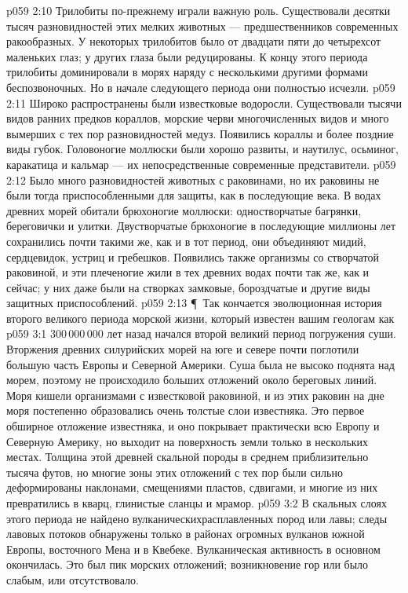 \vs p059 2:10 Трилобиты по\hyp{}прежнему играли важную роль. Существовали десятки тысяч разновидностей этих мелких животных --- предшественников современных ракообразных. У некоторых трилобитов было от двадцати пяти до четырехсот маленьких глаз; у других глаза были редуцированы. К концу этого периода трилобиты доминировали в морях наряду с несколькими другими формами беспозвоночных. Но в начале следующего периода они полностью исчезли.
\vs p059 2:11 Широко распространены были известковые водоросли. Существовали тысячи видов ранних предков кораллов, морские черви многочисленных видов и много вымерших с тех пор разновидностей медуз. Появились кораллы и более поздние виды губок. Головоногие моллюски были хорошо развиты, и наутилус, осьминог, каракатица и кальмар --- их непосредственные современные представители.
\vs p059 2:12 Было много разновидностей животных с раковинами, но их раковины не были тогда приспособленными для защиты, как в последующие века. В водах древних морей обитали брюхоногие моллюски: одностворчатые багрянки, береговички и улитки. Двустворчатые брюхоногие в последующие миллионы лет сохранились почти такими же, как и в тот период, они объединяют мидий, сердцевидок, устриц и гребешков. Появились также организмы со створчатой раковиной, и эти плеченогие жили в тех древних водах почти так же, как и сейчас; у них даже были на створках замковые, бороздчатые и другие виды защитных приспособлений.
\vs p059 2:13 \P\ Так кончается эволюционная история второго великого периода морской жизни, который известен вашим геологам как 
\vs p059 3:1 300\,000\,000 лет назад начался второй великий период погружения суши. Вторжения древних силурийских морей на юге и севере почти поглотили большую часть Европы и Северной Америки. Суша была не высоко поднята над морем, поэтому не происходило больших отложений около береговых линий. Моря кишели организмами с известковой раковиной, и из этих раковин на дне моря постепенно образовались очень толстые слои известняка. Это первое обширное отложение известняка, и оно покрывает практически всю Европу и Северную Америку, но выходит на поверхность земли только в нескольких местах. Толщина этой древней скальной породы в среднем приблизительно тысяча футов, но многие зоны этих отложений с тех пор были сильно деформированы наклонами, смещениями пластов, сдвигами, и многие из них превратились в кварц, глинистые сланцы и мрамор.
\vs p059 3:2 В скальных слоях этого периода не найдено вулканическихрасплавленных пород или лавы; следы лавовых потоков обнаружены только в районах огромных вулканов южной Европы, восточного Мена и в Квебеке. Вулканическая активность в основном окончилась. Это был пик морских отложений; возникновение гор или было слабым, или отсутствовало.
